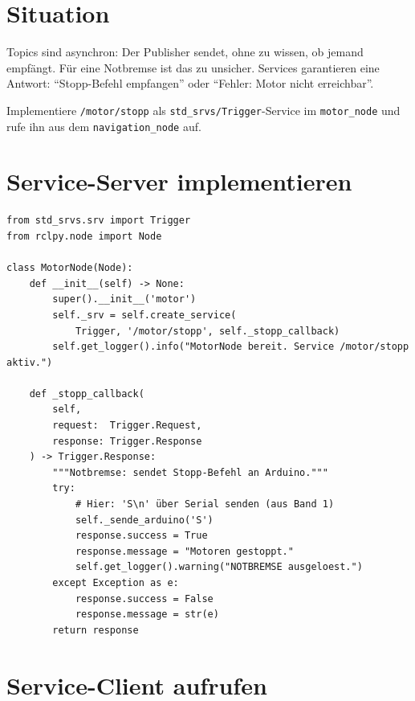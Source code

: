 \section{Situation}

Topics sind asynchron: Der Publisher sendet, ohne zu wissen,
ob jemand empfängt. Für eine Notbremse ist das zu unsicher.
Services garantieren eine Antwort: "`Stopp-Befehl empfangen"' oder
"`Fehler: Motor nicht erreichbar"'.

\begin{aufgabeBox}
Implementiere \texttt{/motor/stopp} als \texttt{std\_srvs/Trigger}-Service
im \texttt{motor\_node} und rufe ihn aus dem \texttt{navigation\_node} auf.
\end{aufgabeBox}

\section{Service-Server implementieren}

\begin{lstlisting}
from std_srvs.srv import Trigger
from rclpy.node import Node

class MotorNode(Node):
    def __init__(self) -> None:
        super().__init__('motor')
        self._srv = self.create_service(
            Trigger, '/motor/stopp', self._stopp_callback)
        self.get_logger().info("MotorNode bereit. Service /motor/stopp aktiv.")

    def _stopp_callback(
        self,
        request:  Trigger.Request,
        response: Trigger.Response
    ) -> Trigger.Response:
        """Notbremse: sendet Stopp-Befehl an Arduino."""
        try:
            # Hier: 'S\n' über Serial senden (aus Band 1)
            self._sende_arduino('S')
            response.success = True
            response.message = "Motoren gestoppt."
            self.get_logger().warning("NOTBREMSE ausgeloest.")
        except Exception as e:
            response.success = False
            response.message = str(e)
        return response
\end{lstlisting}

\section{Service-Client aufrufen}

